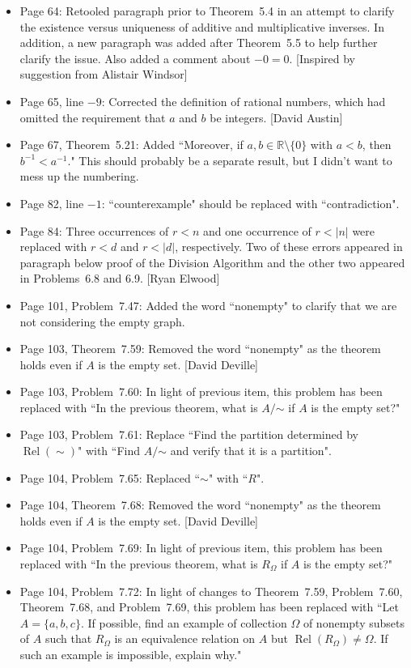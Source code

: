 \documentclass[11pt]{article}%
\newcommand{\Rel}{\operatorname{Rel}}
\begin{document}
\begin{itemize}
\item Page 64: Retooled paragraph prior to Theorem~5.4 in an attempt to clarify the existence versus uniqueness of additive and multiplicative inverses. In addition, a new paragraph was added after Theorem~5.5 to help further clarify the issue. Also added a comment about $-0=0$. [Inspired by suggestion from Alistair Windsor]
\item Page 65, line $-9$: Corrected the definition of rational numbers, which had omitted the requirement that $a$ and $b$ be integers. [David Austin]
\item Page 67, Theorem~5.21: Added ``Moreover, if $a,b\in \mathbb{R}\setminus\{0\}$ with $a<b$, then $b^{-1}<a^{-1}$." This should probably be a separate result, but I didn't want to mess up the numbering.
\item Page 82, line $-1$: ``counterexample" should be replaced with ``contradiction". 
\item Page 84: Three occurrences of $r<n$ and one occurrence of $r<|n|$ were replaced with $r<d$ and $r<|d|$, respectively. Two of these errors appeared in paragraph below proof of the Division Algorithm and the other two appeared in Problems~6.8 and 6.9. [Ryan Elwood]
\item Page 101, Problem~7.47: Added the word ``nonempty" to clarify that we are not considering the empty graph.
\item Page 103, Theorem~7.59: Removed the word ``nonempty" as the theorem holds even if $A$ is the empty set. [David Deville]
\item Page 103, Problem~7.60: In light of previous item, this problem has been replaced  with ``In the previous theorem, what is $A/\mathord\sim$ if $A$ is the empty set?"
\item Page 103, Problem~7.61: Replace ``Find the partition determined by $\Rel(\sim)$" with ``Find $A/\mathord\sim$ and verify that it is a partition".
\item Page 104, Problem~7.65: Replaced ``$\sim$" with ``$R$".
\item Page 104, Theorem~7.68: Removed the word ``nonempty" as the theorem holds even if $A$ is the empty set. [David Deville]
\item Page 104, Problem~7.69: In light of previous item, this problem has been replaced  with ``In the previous theorem, what is $R_{\Omega}$ if $A$ is the empty set?"
\item Page 104, Problem~7.72: In light of changes to Theorem~7.59, Problem~7.60, Theorem~7.68, and Problem~7.69, this problem has been replaced  with ``Let $A=\{a,b,c\}$. If possible, find an example of collection $\Omega$ of nonempty subsets of $A$ such that $R_{\Omega}$ is an equivalence relation on $A$ but $\Rel(R_{\Omega})\neq \Omega$.  If such an example is impossible, explain why."

\end{itemize}
\end{document}
